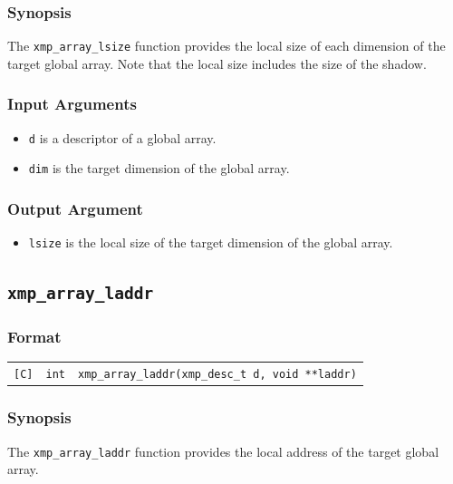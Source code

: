 \subsubsection*{Synopsis}

The {\tt xmp\_array\_lsize} function provides the local size of each
dimension of the target global array. Note that the local size includes
the size of the shadow.

\subsubsection*{Input Arguments}
\begin{itemize}
 \item {\tt d} is a descriptor of a global array.
 \item {\tt dim} is the target dimension of the global array.
\end{itemize}

\subsubsection*{Output Argument}
\begin{itemize}
 \item {\tt lsize} is the local size of the target dimension of the global array.
\end{itemize}


\subsection{\tt xmp\_array\_laddr}

\subsubsection*{Format}

\begin{tabular}{lll}

\verb![C]!&  {\tt int}& {\tt xmp\_array\_laddr(xmp\_desc\_t d, void **laddr)}\\

\end{tabular}

\subsubsection*{Synopsis}

The {\tt xmp\_array\_laddr} function provides the local address of the
target global array. 

